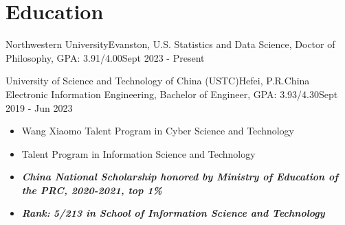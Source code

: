 \section{Education}
  \resumeSubHeadingListStart
    \resumeSubheading
        {Northwestern University}{Evanston, U.S.}
        {Statistics and Data Science, Doctor of Philosophy, GPA: 3.91/4.00}{Sept 2023 - Present}
            
        
    \resumeSubheading
        {University of Science and Technology of China (USTC)}{Hefei, P.R.China}
        {Electronic Information Engineering, Bachelor of Engineer, GPA: 3.93/4.30}{Sept 2019 - Jun 2023}
        \vspace{-7pt}
         \begin{itemize}
         \setlength{\itemsep}{0pt}
            \item\small 
            Wang Xiaomo Talent Program in Cyber Science and Technology 
            \item\small
            Talent Program in Information Science and Technology 
            \item\small
            \textit{\textbf{China National Scholarship honored by Ministry of Education of the PRC, 2020-2021, top 1\%}}
            \item\small
            \textit{\textbf{Rank:} \textbf{5/213 in School of Information Science and Technology}}
            
         \end{itemize}
         
